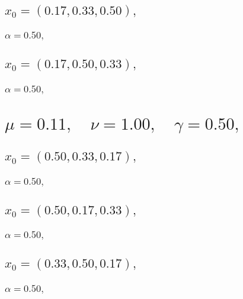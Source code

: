 \documentclass[a4paper]{article}
\begin{document}
\begin{multicols*}{2}
   \subsection{\(x_0 = (0.17,0.33,0.50),\quad \)}
   

   \subsubsection{\(\alpha = 0.50,\quad \)}
   

   \subsection{\(x_0 = (0.17,0.50,0.33),\quad \)}
   

   \subsubsection{\(\alpha = 0.50,\quad \)}
   

   \section{\(\mu = 0.11,\quad \nu = 1.00,\quad \gamma = 0.50,\quad \)}
   

   \subsection{\(x_0 = (0.50,0.33,0.17),\quad \)}
   

   \subsubsection{\(\alpha = 0.50,\quad \)}
   

   \subsection{\(x_0 = (0.50,0.17,0.33),\quad \)}
   

   \subsubsection{\(\alpha = 0.50,\quad \)}
   

   \subsection{\(x_0 = (0.33,0.50,0.17),\quad \)}
   

   \subsubsection{\(\alpha = 0.50,\quad \)}
   


\end{multicols*}
\end{document}
